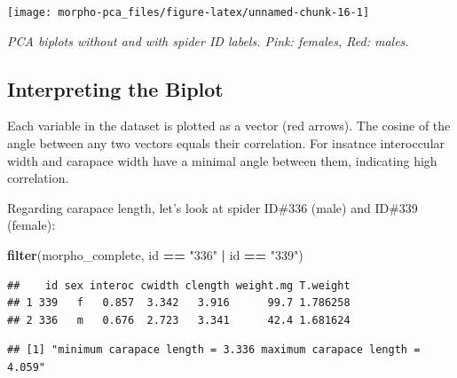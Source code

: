 \documentclass[]{article}
\newenvironment{Shaded}{\begin{snugshade}}{\end{snugshade}}
\newcommand{\DataTypeTok}[1]{\textcolor[rgb]{0.13,0.29,0.53}{#1}}
\newcommand{\KeywordTok}[1]{\textcolor[rgb]{0.13,0.29,0.53}{\textbf{#1}}}
\newcommand{\NormalTok}[1]{#1}
\newcommand{\OperatorTok}[1]{\textcolor[rgb]{0.81,0.36,0.00}{\textbf{#1}}}
\newcommand{\StringTok}[1]{\textcolor[rgb]{0.31,0.60,0.02}{#1}}
\begin{document}
\begin{center}\texttt{[image: morpho-pca\_files/figure-latex/unnamed-chunk-16-1]} \end{center}

\emph{PCA biplots without and with spider ID labels. Pink: females, Red:
males.}

\hypertarget{interpreting-the-biplot}{%
\subsection{Interpreting the Biplot}\label{interpreting-the-biplot}}

Each variable in the dataset is plotted as a vector (red arrows). The
cosine of the angle between any two vectors equals their correlation.
For insatnce interoccular width and carapace width have a minimal angle
between them, indicating high correlation.

Regarding carapace length, let's look at spider ID\#336 (male) and
ID\#339 (female):

\begin{Shaded}
\begin{Highlighting}[]
\KeywordTok{filter}\NormalTok{(morpho_complete, id }\OperatorTok{==}\StringTok{ "336"} \OperatorTok{|}\StringTok{ }\NormalTok{id }\OperatorTok{==}\StringTok{ "339"}\NormalTok{)}
\end{Highlighting}
\end{Shaded}

\begin{verbatim}
##    id sex interoc cwidth clength weight.mg T.weight
## 1 339   f   0.857  3.342   3.916      99.7 1.786258
## 2 336   m   0.676  2.723   3.341      42.4 1.681624
\end{verbatim}

\begin{Shaded}
\end{Shaded}

\begin{verbatim}
## [1] "minimum carapace length = 3.336 maximum carapace length = 4.059"
\end{verbatim}
\end{document}
